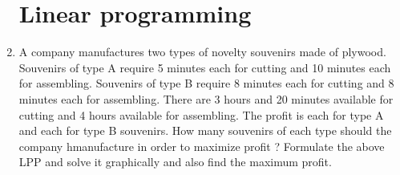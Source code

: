 
\begin{enumerate}
\section{Linear programming}
\item A company manufactures two types of novelty souvenirs made of plywood. Souvenirs of type A require 5 minutes each for cutting and 10 minutes each for assembling. Souvenirs of type B require 8 minutes each for cutting and 8 minutes each for assembling. There are 3 hours and 20 minutes available for cutting and 4 hours available for assembling. The profit is  each for type A and  each for type B souvenirs. How many souvenirs of each type should the company hmanufacture in order to maximize profit ? Formulate the above LPP and solve it graphically and also find the maximum profit.
\end{enumerate}
